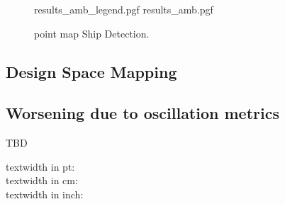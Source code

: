 \documentclass[11pt, a4paper]{scrartcl}
\begin{document}
    \begin{figure}[!htb]
        \centering
        {results_amb_legend.pgf}
        {results_amb.pgf}
        \caption{point map Ship Detection.}
        \label{fig:ambigresult}
    \end{figure}

    \subsection{Design Space Mapping}
    \label{subsec:design_space_mapping}

    \subsection{Worsening due to oscillation metrics}
    \label{subsec:worsening_due_to_oscillation_metrics}
    TBD


    
    

    textwidth in pt: \the\textwidth \\
    textwidth in cm: \prntlen{\textwidth}\\
    textwidth in inch: \prntlen{\textwidth}\\
\end{document}
